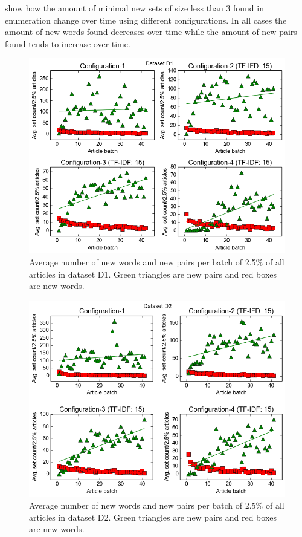  show how the amount of minimal new sets of size less than 3 found in enumeration change over time using different configurations. In all cases the amount of new words found decreases over time while the amount of new pairs found tends to increase over time.

\begin{figure}[ht]
  \centering
  \includegraphics[scale=0.50]{images/D1-plot.png}
  \caption{Average number of new words and new pairs per batch of 2.5\% of all articles in dataset D1. Green triangles are new pairs and red boxes are new words.}
  \label{fig:setPlot1}
\end{figure}

\begin{figure}[ht]
  \centering
  \includegraphics[scale=0.50]{images/D2-plot.png}
  \caption{Average number of new words and new pairs per batch of 2.5\% of all articles in dataset D2. Green triangles are new pairs and red boxes are new words.}
  \label{fig:setPlot2}
\end{figure}

